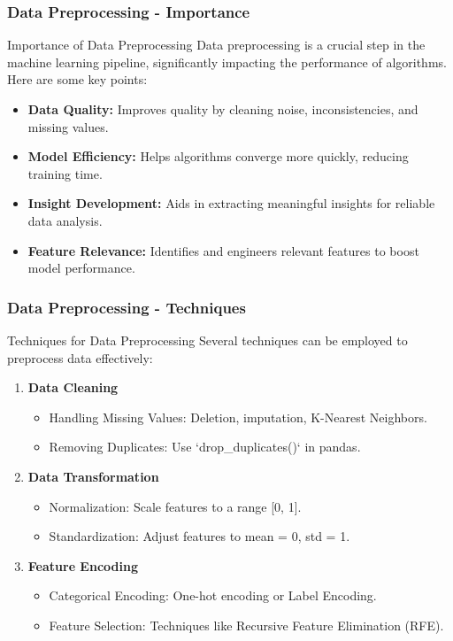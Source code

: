 \documentclass[aspectratio=169]{beamer}
\begin{document}
\begin{frame}[fragile]
    \frametitle{Data Preprocessing - Importance}
    \begin{block}{Importance of Data Preprocessing}
        Data preprocessing is a crucial step in the machine learning pipeline, significantly impacting the performance of algorithms. Here are some key points:
    \end{block}
    \begin{itemize}
        \item \textbf{Data Quality:} Improves quality by cleaning noise, inconsistencies, and missing values.
        \item \textbf{Model Efficiency:} Helps algorithms converge more quickly, reducing training time.
        \item \textbf{Insight Development:} Aids in extracting meaningful insights for reliable data analysis.
        \item \textbf{Feature Relevance:} Identifies and engineers relevant features to boost model performance.
    \end{itemize}
\end{frame}

\begin{frame}[fragile]
    \frametitle{Data Preprocessing - Techniques}
    \begin{block}{Techniques for Data Preprocessing}
        Several techniques can be employed to preprocess data effectively:
    \end{block}
    \begin{enumerate}
        \item \textbf{Data Cleaning}
            \begin{itemize}
                \item Handling Missing Values: Deletion, imputation, K-Nearest Neighbors.
                \item Removing Duplicates: Use `drop_duplicates()` in pandas.
            \end{itemize}
        \item \textbf{Data Transformation}
            \begin{itemize}
                \item Normalization: Scale features to a range [0, 1].
                \item Standardization: Adjust features to mean = 0, std = 1.
            \end{itemize}
        \item \textbf{Feature Encoding}
            \begin{itemize}
                \item Categorical Encoding: One-hot encoding or Label Encoding.
                \item Feature Selection: Techniques like Recursive Feature Elimination (RFE).
            \end{itemize}
    \end{enumerate}
\end{frame}
\end{document}
